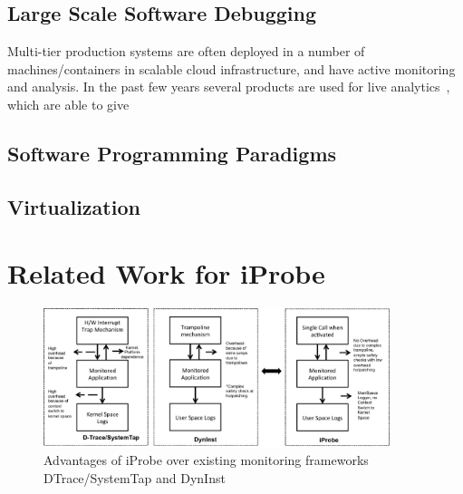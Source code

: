\subsection{Large Scale Software Debugging}

Multi-tier production systems are often deployed in a number of machines/containers in scalable cloud infrastructure, and have active monitoring and analysis.
In the past few years several products are used for live analytics~\cite{nagios,magpie,vPath}, which are able to give 


\subsection{Software Programming Paradigms}


\subsection{Virtualization}

\section{Related Work for iProbe}



\begin{figure}[ht]
	\begin{center}
		\includegraphics[width=0.9\textwidth]{iprobe/Images/related.eps}
		\caption{Advantages of iProbe over existing monitoring frameworks DTrace/SystemTap and DynInst}
		\label{fig:related}
	\end{center}
\end{figure}


